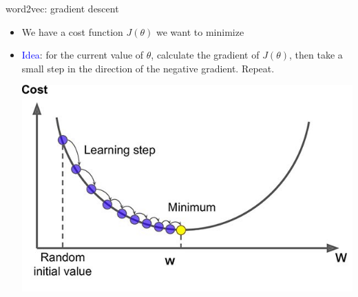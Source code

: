 \documentclass[usenames,dvipsnames,english]{beamer}
\begin{document}
\begin{frame}{word2vec: gradient descent}
    \begin{itemize}
        \setlength{\itemsep}{1em}
        \item We have a cost function $J(\theta)$ we want to minimize
        \item \textcolor{blue}{Idea}: for the current value of $\theta$, calculate the gradient of $J(\theta)$, then take a small step in the direction of the negative gradient. Repeat. 
        \begin{center}
        \vspace{5pt}
    \includegraphics[scale=0.4]{Images/we_gradient.jpeg}
    \end{center}
    \end{itemize}
    
\end{frame}
\end{document}
